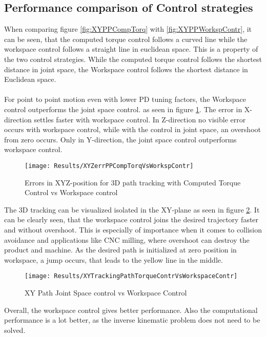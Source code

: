 \subsection{Performance comparison of Control strategies}
When comparing figure \ref{fig:XYPPCompTorq} with \ref{fig:XYPPWorkspContr}, it can be seen, that the computed torque control follows a curved line while the workspace control follows a straight line in euclidean space. This is a property of the two control strategies. While the computed torque control follows the shortest distance in joint space, the Workspace control follows the shortest distance in Euclidean space.\\
\\
For point to point motion even with lower PD tuning factors, the Workspace control outperforms the joint space control. as seen in figure \ref{fig:XYZerrPPCompTorqVsWorkspContr}. The error in X-direction settles faster with workspace control. In Z-direction no visible error occurs with workspace control, while with the control in joint space, an overshoot from zero occurs. Only in Y-direction, the joint space control outperforms workspace control.
\begin{figure}[H]
	\texttt{[image: Results/XYZerrPPCompTorqVsWorkspContr]}
	\caption{Errors in XYZ-position for 3D path tracking with Computed Torque Control vs Workspace control}
	\label{fig:XYZerrPPCompTorqVsWorkspContr}
\end{figure}

The 3D tracking can be visualized isolated in the XY-plane as seen in figure \ref{fig:XYTrackingPathTorqueContrVsWorkspaceContr}. It can be clearly seen, that the workspace control joins the desired trajectory faster and without overshoot. This is especially of importance when it comes to collision avoidance and applications like \ac{CNC} milling, where overshoot can destroy the product and machine. As the desired path is initialized at zero position in workspace, a jump occurs, that leads to the yellow line in the middle.

\begin{figure}[H]
	\texttt{[image: Results/XYTrackingPathTorqueContrVsWorkspaceContr]}
	\caption{XY Path Joint Space control vs Workspace Control}
	\label{fig:XYTrackingPathTorqueContrVsWorkspaceContr}
\end{figure}



Overall, the workspace control gives better performance. Also the computational performance is a lot better, as the inverse kinematic problem does not need to be solved.

